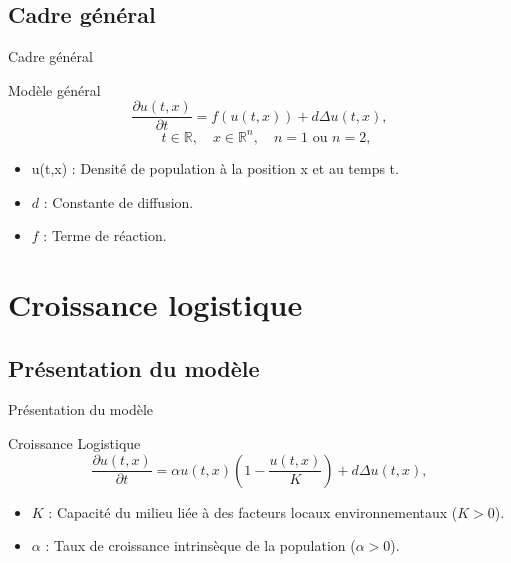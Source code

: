 \documentclass[10pt]{beamer}
\begin{document}
\subsection{Cadre général}

\begin{frame}{Cadre général}{}
\begin{block}{Modèle général}
	\begin{equation}
		\frac{\partial u(t,x)}{\partial t}=f(u(t,x))+d\Delta u(t,x),
	\end{equation}
	\vspace{0.1cm}
	$$	\quad t \in \mathbb{R}, \quad x \in \mathbb{R}^n, \quad n=1 \text{ ou } n=2,$$

	
\end{block}
\begin{itemize}
	\item u(t,x) : Densité de population à la position x et au temps t. 
    \item $d$ : Constante de diffusion. 
    \item $f$ : Terme de réaction.
\end{itemize}
\end{frame}

\section{Croissance logistique}
\subsection{Présentation du modèle}
\begin{frame}{Présentation du modèle}{}
\begin{block}{Croissance Logistique}
	$$\frac{\partial u(t,x)}{\partial t}=\alpha  u(t,x) \left( 1 - \dfrac{u(t,x)}{K}\right) +d\Delta u(t,x),$$
\end{block}
\begin{itemize}
    \item $K$ : Capacité du milieu liée à des facteurs locaux environnementaux ($K> 0$).
    \item $\alpha$ : Taux de croissance intrinsèque de la population ($\alpha >0$).
\end{itemize}
\end{frame}
\end{document}
